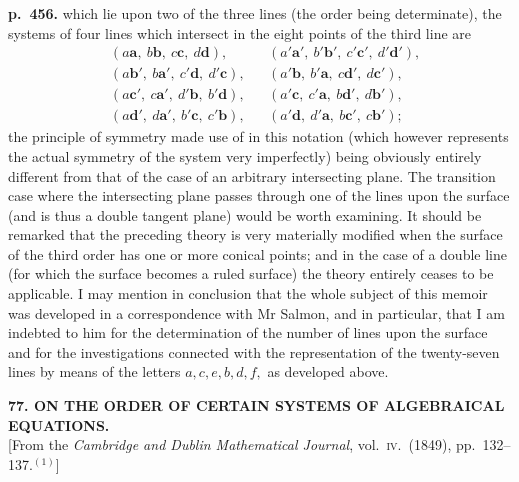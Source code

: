 \documentclass[11pt]{article}
\begin{document}
\bigskip
\noindent\textbf{p.~456.} which lie upon two of the three lines (the order being determinate), the systems of four lines which intersect in the eight points of the third line are
\[
\begin{aligned}
& (a\mathbf{a},\ b\mathbf{b},\ c\mathbf{c},\ d\mathbf{d}), & & (a'\mathbf{a}',\ b'\mathbf{b}',\ c'\mathbf{c}',\ d'\mathbf{d}'),\\
& (a\mathbf{b}',\ b\mathbf{a}',\ c'\mathbf{d},\ d'\mathbf{c}), & & (a'\mathbf{b},\ b'\mathbf{a},\ c\mathbf{d}',\ d\mathbf{c}'),\\
& (a\mathbf{c}',\ c\mathbf{a}',\ d'\mathbf{b},\ b'\mathbf{d}), & & (a'\mathbf{c},\ c'\mathbf{a},\ b\mathbf{d}',\ d\mathbf{b}'),\\
& (a\mathbf{d}',\ d\mathbf{a}',\ b'\mathbf{c},\ c'\mathbf{b}), & & (a'\mathbf{d},\ d'\mathbf{a},\ b\mathbf{c}',\ c\mathbf{b}');
\end{aligned}
\]
the principle of symmetry made use of in this notation (which however represents the actual symmetry of the system very imperfectly) being obviously entirely different from that of the case of an arbitrary intersecting plane. The transition case where the intersecting plane passes through one of the lines upon the surface (and is thus a double tangent plane) would be worth examining. It should be remarked that the preceding theory is very materially modified when the surface of the third order has one or more conical points; and in the case of a double line (for which the surface becomes a ruled surface) the theory entirely ceases to be applicable. I may mention in conclusion that the whole subject of this memoir was developed in a correspondence with Mr Salmon, and in particular, that I am indebted to him for the determination of the number of lines upon the surface and for the investigations connected with the representation of the twenty-seven lines by means of the letters $a, c, e, b, d, f,$ as developed above.

\bigskip
\begin{center}
\textbf{77. ON THE ORDER OF CERTAIN SYSTEMS OF ALGEBRAICAL EQUATIONS.}\\[2pt]
[From the \textit{Cambridge and Dublin Mathematical Journal}, vol.~\textsc{iv}.\ (1849), pp.~132--137.$^{(1)}$]
\end{center}
\end{document}
